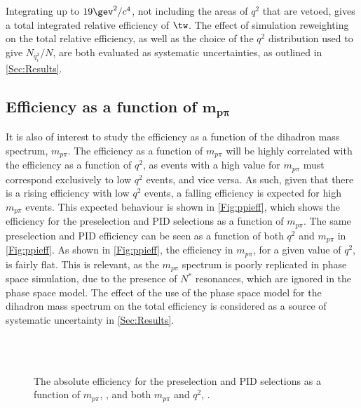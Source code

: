 Integrating up to $19 \gev^{2}/c^{4}$, not including the areas of $q^{2}$ that are vetoed, gives a total integrated relative efficiency of $\tw$. The effect of simulation reweighting  on the total relative efficiency, as well as the choice of the $q^{2}$ distribution used to give $N_{q^{2}_{i}}/N$, are both evaluated as systematic uncertainties, as outlined in \autoref{Sec:Results}. 
\subsection[Efficiency as a function of $m_{p\pi}$]{Efficiency as a function of $\mathbold{m_{p\pi}}$}

It is also of interest to study the efficiency as a function of the dihadron mass spectrum, $m_{p\pi}$. The efficiency as a function of $m_{p\pi}$ will be highly correlated with the efficiency as a function of $q^{2}$, as events with a high value for $m_{p\pi}$ must correspond exclusively to low $q^{2}$ events, and vice versa. As such, given that there is a rising efficiency with low $q^{2}$ events, a falling efficiency is expected for high $m_{p\pi}$ events.
This expected behaviour is shown in \autoref{Fig:ppieff}\protect{}, which shows the efficiency for the preselection and PID selections as a function of $m_{p\pi}$. The same preselection and PID efficiency can be seen as a function of both $q^{2}$ and $m_{p\pi}$ in \autoref{Fig:ppieff}\protect{}. As shown in \autoref{Fig:ppieff}\protect{}, the efficiency in $m_{p\pi}$, for a given value of $q^{2}$, is fairly flat. This is relevant, as the $m_{p\pi}$ spectrum is poorly replicated in phase space simulation, due to the presence of $N^{*}$ resonances, which are ignored in the phase space model. The effect of the use of the phase space model for the dihadron mass spectrum on the total efficiency is considered as a source of systematic uncertainty in \autoref{Sec:Results}.
\begin{figure}[!t]\def\nh{0.3\textwidth}
  \centering
  \\
  \hspace*{1cm}
  \\

  \caption{ The absolute efficiency for the preselection and PID selections as a function of $m_{p\pi}$, \protect{}, and both $m_{p\pi}$ and $q^{2}$, \protect{}.}
\label{Fig:ppieff}

\end{figure}


 
